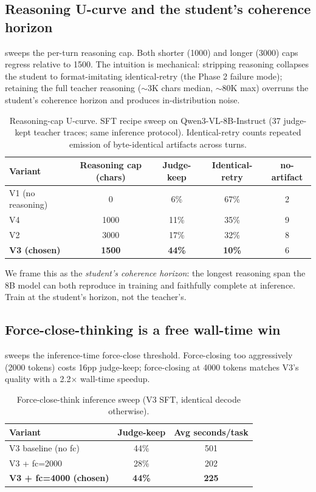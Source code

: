 \documentclass[11pt]{article}
\begin{document}
\subsection{Reasoning U-curve and the student's coherence horizon}

 sweeps the per-turn reasoning cap. Both shorter (1000) and longer (3000) caps regress relative to 1500. The intuition is mechanical: stripping reasoning collapses the student to format-imitating identical-retry (the Phase 2 failure mode); retaining the full teacher reasoning ($\sim$3K chars median, $\sim$80K max) overruns the student's coherence horizon and produces in-distribution noise.

\begin{table}[t]
\centering
\caption{Reasoning-cap U-curve. SFT recipe sweep on Qwen3-VL-8B-Instruct (37 judge-kept teacher traces; same inference protocol). Identical-retry counts repeated emission of byte-identical artifacts across turns.}
\label{tab:reasoning-ucurve}
\begin{tabular}{lcccc}
\toprule
Variant & Reasoning cap (chars) & Judge-keep & Identical-retry & no-artifact \\
\midrule
V1 (no reasoning) & 0 & 6\% & 67\% & 2 \\
V4 & 1000 & 11\% & 35\% & 9 \\
V2 & 3000 & 17\% & 32\% & 8 \\
\textbf{V3 (chosen)} & \textbf{1500} & \textbf{44\%} & \textbf{10\%} & 6 \\
\bottomrule
\end{tabular}
\end{table}

We frame this as the \emph{student's coherence horizon}: the longest reasoning span the 8B model can both reproduce in training and faithfully complete at inference. Train at the student's horizon, not the teacher's.

\subsection{Force-close-thinking is a free wall-time win}

 sweeps the inference-time force-close threshold. Force-closing too aggressively (2000 tokens) costs 16pp judge-keep; force-closing at 4000 tokens matches V3's quality with a 2.2$\times$ wall-time speedup.

\begin{table}[t]
\centering
\caption{Force-close-think inference sweep (V3 SFT, identical decode otherwise).}
\label{tab:fc-sweet-spot}
\begin{tabular}{lcc}
\toprule
Variant & Judge-keep & Avg seconds/task \\
\midrule
V3 baseline (no fc) & 44\% & 501 \\
V3 + fc=2000 & 28\% & 202 \\
\textbf{V3 + fc=4000 (chosen)} & \textbf{44\%} & \textbf{225} \\
\bottomrule
\end{tabular}
\end{table}
\end{document}
